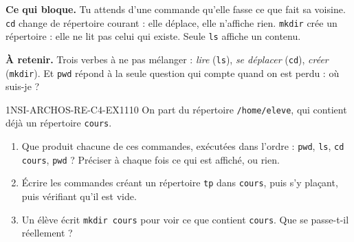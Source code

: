 

\textbf{Ce qui bloque.} Tu attends d'une commande qu'elle fasse ce que fait sa voisine.
\lstinline{cd} change de répertoire courant : elle déplace, elle n'affiche rien.
\lstinline{mkdir} crée un répertoire : elle ne lit pas celui qui existe. Seule
\lstinline{ls} affiche un contenu.

\textbf{À retenir.} Trois verbes à ne pas mélanger : \emph{lire} (\lstinline{ls}),
\emph{se déplacer} (\lstinline{cd}), \emph{créer} (\lstinline{mkdir}). Et \lstinline{pwd}
répond à la seule question qui compte quand on est perdu : où suis-je ?

\begin{exercice}{1NSI-ARCHOS-RE-C4-EX1}{1}{10}
On part du répertoire \lstinline{/home/eleve}, qui contient déjà un répertoire
\lstinline{cours}.
\begin{enumerate}
  \item Que produit chacune de ces commandes, exécutées dans l'ordre :
        \lstinline{pwd}, \lstinline{ls}, \lstinline{cd cours}, \lstinline{pwd} ?
        Préciser à chaque fois ce qui est affiché, ou rien.
  \item Écrire les commandes créant un répertoire \lstinline{tp} dans \lstinline{cours}, puis
        s'y plaçant, puis vérifiant qu'il est vide.
  \item Un élève écrit \lstinline{mkdir cours} pour voir ce que contient \lstinline{cours}.
        Que se passe-t-il réellement ?
\end{enumerate}
\end{exercice}
